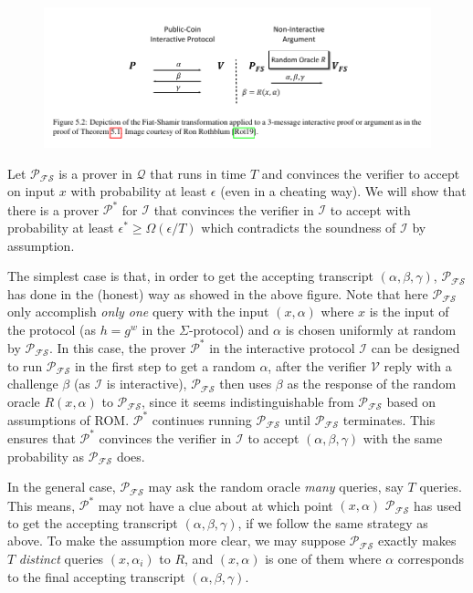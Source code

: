 \documentclass{article}
\begin{document}
\begin{figure}[H]
\centering
\includegraphics[scale=0.5]{sigma-fiat-shamir}
\end{figure}

Let $\mathcal{P_{FS}}$ is a prover in $\mathcal{Q}$ that runs in time $T$ and convinces the verifier to accept on input $x$ with probability at least $\epsilon$ (even in a cheating way). We will show that there is a prover $\mathcal{P}^{\displaystyle *}$ for $\mathcal{I}$ that convinces the verifier in $\mathcal{I}$ to accept with probability at least $\epsilon^{\displaystyle *} \geq \Omega(\epsilon/T)$ which contradicts the soundness of $\mathcal{I}$ by assumption. 

The simplest case is that, in order to get the accepting transcript $(\alpha, \beta, \gamma)$, $\mathcal{P_{FS}}$ has done in the (honest) way as showed in the above figure. Note that here $\mathcal{P_{FS}}$ only accomplish \textit{only one} query with the input $(x, \alpha)$ where $x$ is the input of the protocol (as $h = g^{w}$ in the $\Sigma$-protocol) and $\alpha$ is chosen uniformly at random by $\mathcal{P_{FS}}$. In this case, the prover $\mathcal{P}^{\displaystyle *}$ in the interactive protocol $\mathcal{I}$ can be designed to run $\mathcal{P_{FS}}$ in the first step to get a random $\alpha$, after the verifier $\mathcal{V}$ reply with a challenge $\beta$ (as $\mathcal{I}$ is interactive), $\mathcal{P_{FS}}$ then uses $\beta$ as the response of the random oracle $R(x, \alpha)$ to $\mathcal{P_{FS}}$, since it seems indistinguishable from $\mathcal{P_{FS}}$ based on assumptions of ROM. $\mathcal{P}^{\displaystyle *}$ continues running $\mathcal{P_{FS}}$ until $\mathcal{P_{FS}}$ terminates. This ensures that $\mathcal{P}^{\displaystyle *}$ convinces the verifier in $\mathcal{I}$ to accept $(\alpha, \beta, \gamma)$ with the same probability as $\mathcal{P_{FS}}$ does. 

In the general case, $\mathcal{P_{FS}}$ may ask the random oracle \textit{many} queries, say $T$ queries. This means, $\mathcal{P}^{\displaystyle *}$ may not have a clue about at which point $(x, \alpha)$ $\mathcal{P_{FS}}$ has used to get the accepting transcript $(\alpha, \beta, \gamma)$, if we follow the same strategy as above. To make the assumption more clear, we may suppose $\mathcal{P_{FS}}$ exactly makes $T$ \textit{distinct} queries $(x, \alpha_i)$ to $R$, and $(x, \alpha)$ is one of them where $\alpha$ corresponds to the final accepting transcript $(\alpha, \beta, \gamma)$.
\end{document}
